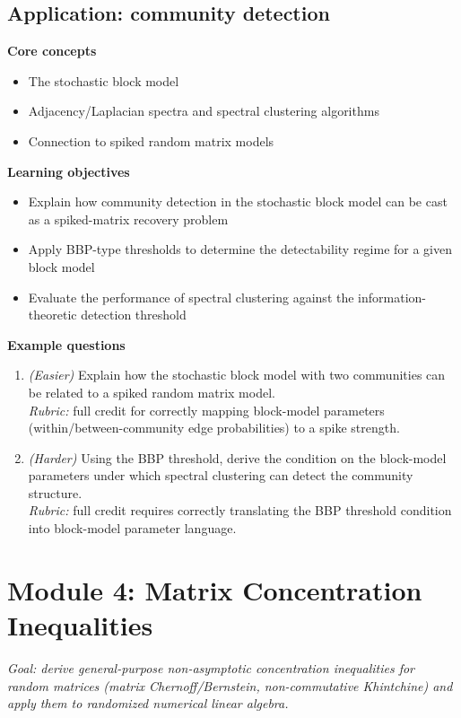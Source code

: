 \documentclass[11pt]{article}
\begin{document}
\subsection{Application: community detection}
\textbf{Core concepts}
\begin{itemize}[nosep]
\item The stochastic block model
\item Adjacency/Laplacian spectra and spectral clustering algorithms
\item Connection to spiked random matrix models
\end{itemize}
\textbf{Learning objectives}
\begin{itemize}[nosep]
\item Explain how community detection in the stochastic block model can be cast as a spiked-matrix recovery problem
\item Apply BBP-type thresholds to determine the detectability regime for a given block model
\item Evaluate the performance of spectral clustering against the information-theoretic detection threshold
\end{itemize}
\textbf{Example questions}
\begin{enumerate}[nosep]
\item \emph{(Easier)} Explain how the stochastic block model with two communities can be related to a spiked random matrix model. \\
\emph{Rubric:} full credit for correctly mapping block-model parameters (within/between-community edge probabilities) to a spike strength.
\item \emph{(Harder)} Using the BBP threshold, derive the condition on the block-model parameters under which spectral clustering can detect the community structure. \\
\emph{Rubric:} full credit requires correctly translating the BBP threshold condition into block-model parameter language.
\end{enumerate}

\section{Module 4: Matrix Concentration Inequalities}
\emph{Goal: derive general-purpose non-asymptotic concentration inequalities for random matrices (matrix Chernoff/Bernstein, non-commutative Khintchine) and apply them to randomized numerical linear algebra.}
\end{document}
